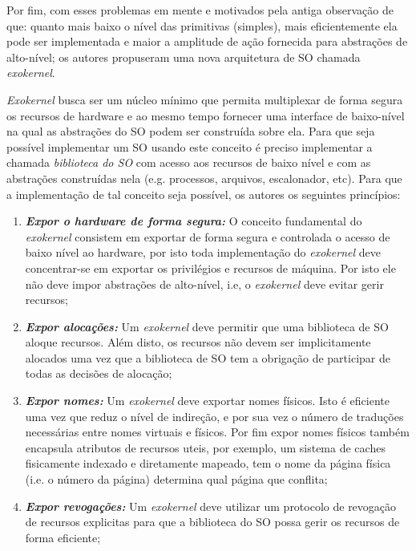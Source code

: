 Por fim, com esses problemas em mente e motivados pela antiga observação de que:
quanto mais baixo o nível das primitivas (simples), mais eficientemente ela
pode ser implementada e maior a amplitude de ação fornecida para abstrações de
alto-nível; os autores propuseram uma nova arquitetura de SO chamada
\emph{exokernel}.

\emph{Exokernel} busca ser um núcleo mínimo que permita multiplexar de forma
segura os recursos de hardware e ao mesmo tempo fornecer uma interface de
baixo-nível na qual as abstrações do SO podem ser construída sobre ela. Para
que seja possível implementar um SO usando este conceito é preciso implementar
a chamada \textit{biblioteca do SO} com acesso aos recursos de baixo nível e
com as abstrações construídas nela (e.g. processos, arquivos, escalonador,
etc). Para que a implementação de tal conceito seja possível, os autores os
seguintes princípios:

\begin{enumerate}
  \item \textbf{\emph{Expor o hardware de forma segura:}} O conceito
        fundamental do \emph{exokernel} consistem em exportar de forma segura
        e controlada o acesso de baixo nível ao hardware, por isto toda
        implementação do \emph{exokernel} deve concentrar-se em exportar os
        privilégios e recursos de máquina. Por isto ele não deve impor
        abstrações de alto-nível, i.e, o \emph{exokernel} deve evitar gerir
        recursos;
  \item \textbf{\emph{Expor alocações:}} Um \emph{exokernel} deve permitir que
        uma biblioteca de SO aloque recursos. Além disto, os recursos não devem
        ser implicitamente alocados uma vez que a biblioteca de SO tem a
        obrigação de participar de todas as decisões de alocação;
  \item \textbf{\emph{Expor nomes:}} Um \emph{exokernel} deve exportar nomes
        físicos. Isto é eficiente uma vez que reduz o nível de indireção, e por
        sua vez o número de traduções necessárias entre nomes virtuais e
        físicos. Por fim expor nomes físicos também encapsula atributos de
        recursos uteis, por exemplo, um sistema de caches fisicamente indexado
        e diretamente mapeado, tem o nome da página física (i.e. o número da
        página) determina qual página que conflita;
  \item \textbf{\emph{Expor revogações:}} Um \emph{exokernel} deve utilizar um
        protocolo de revogação de recursos explicitas para que a biblioteca do
        SO possa gerir os recursos de forma eficiente;
\end{enumerate}

